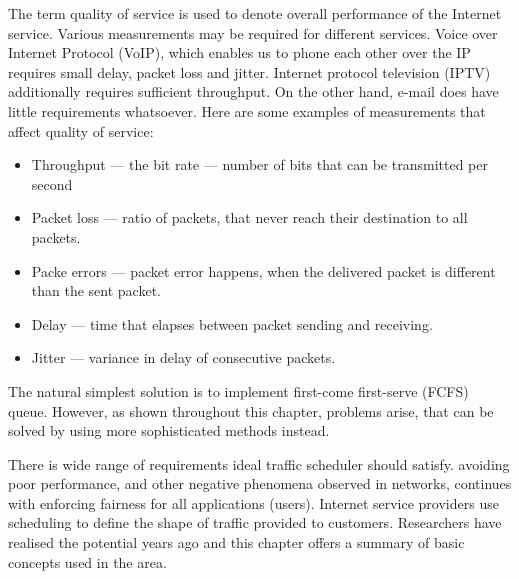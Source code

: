 The term quality of service is used to denote overall performance of the Internet service. Various measurements may be required for different services. Voice over Internet Protocol (VoIP), which enables us to phone each other over the IP  requires small delay, packet loss and jitter. Internet protocol television (IPTV) additionally requires sufficient throughput. On the other hand, e-mail does have little requirements whatsoever. Here are some examples of measurements that affect quality of service:
\begin{itemize}
	\item Throughput --- the bit rate --- number of bits that can be transmitted per second
	\item Packet loss --- ratio of packets, that never reach their destination to all packets.
	\item Packe errors --- packet error happens, when the delivered packet is different than the sent packet.
	\item Delay --- time that elapses between packet sending and receiving.
	\item Jitter --- variance in delay of consecutive packets.
\end{itemize}

The natural simplest solution  is to implement first-come first-serve (FCFS) queue. However, as shown throughout this chapter, problems arise, that can be solved by using more sophisticated methods instead.

There is wide range of requirements ideal traffic scheduler should satisfy.  avoiding poor performance, and other negative phenomena observed in networks, continues with enforcing fairness for all applications (users). Internet service providers use scheduling to define the shape of traffic provided to customers. Researchers have realised the potential years ago and this chapter offers a summary of basic concepts used in the area.



